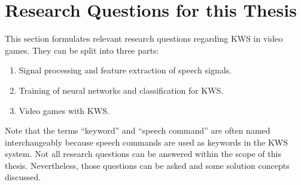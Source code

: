 
\section{Research Questions for this Thesis}\label{sec:intro_rq}
This section formulates relevant research questions regarding KWS in video games.
They can be split into three parts:
\begin{enumerate}[label={Q.\arabic*)}, leftmargin=1.4cm]
  \item Signal processing and feature extraction of speech signals.
  \item Training of neural networks and classification for KWS.
  \item Video games with KWS.
\end{enumerate}
Note that the terms \enquote{keyword} and \enquote{speech command} are often named interchangeably because speech commands are used as keywords in the KWS system.
Not all research questions can be answered within the scope of this thesis.
Nevertheless, those questions can be asked and some solution concepts discussed.



